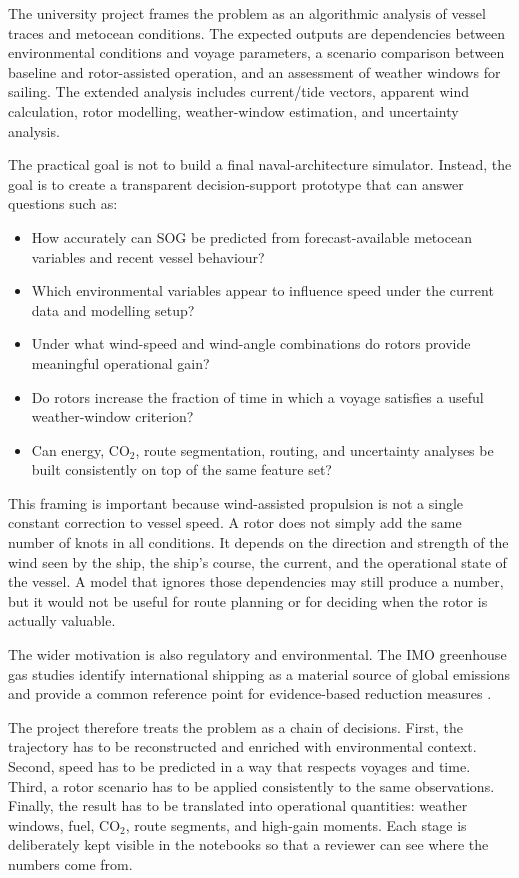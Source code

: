 \documentclass[10pt,a4paper]{article}
\newcommand{\co}{CO$_2$}
\newcommand{\sog}{SOG}
\begin{document}
The university project frames the problem as an algorithmic analysis of vessel
traces and metocean conditions. The expected outputs are dependencies between
environmental conditions and voyage parameters, a scenario comparison between
baseline and rotor-assisted operation, and an assessment of weather windows for
sailing. The extended analysis includes current/tide vectors, apparent wind
calculation, rotor modelling, weather-window estimation, and uncertainty
analysis.

The practical goal is not to build a final naval-architecture simulator. Instead,
the goal is to create a transparent decision-support prototype that can answer
questions such as:

\begin{itemize}
    \item How accurately can \sog{} be predicted from forecast-available
    metocean variables and recent vessel behaviour?
    \item Which environmental variables appear to influence speed under the
    current data and modelling setup?
    \item Under what wind-speed and wind-angle combinations do rotors provide
    meaningful operational gain?
    \item Do rotors increase the fraction of time in which a voyage satisfies a
    useful weather-window criterion?
    \item Can energy, \co{}, route segmentation, routing, and uncertainty
    analyses be built consistently on top of the same feature set?
\end{itemize}

This framing is important because wind-assisted propulsion is not a single
constant correction to vessel speed. A rotor does not simply add the same
number of knots in all conditions. It depends on the direction and strength of
the wind seen by the ship, the ship's course, the current, and the operational
state of the vessel. A model that ignores those dependencies may still produce a
number, but it would not be useful for route planning or for deciding when the
rotor is actually valuable.

The wider motivation is also regulatory and environmental. The IMO greenhouse
gas studies identify international shipping as a material source of global
emissions and provide a common reference point for evidence-based reduction
measures \cite{imo2020ghg}.

The project therefore treats the problem as a chain of decisions. First, the
trajectory has to be reconstructed and enriched with environmental context.
Second, speed has to be predicted in a way that respects voyages and time.
Third, a rotor scenario has to be applied consistently to the same observations.
Finally, the result has to be translated into operational quantities: weather
windows, fuel, \co{}, route segments, and high-gain moments. Each stage is
deliberately kept visible in the notebooks so that a reviewer can see where the
numbers come from.
\end{document}
